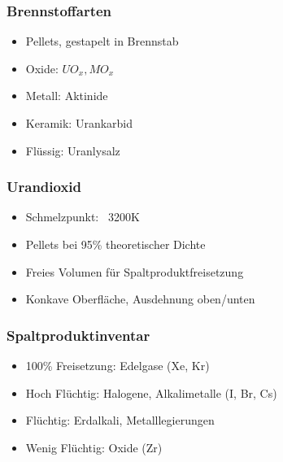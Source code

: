 \documentclass[12pt]{article}
\begin{document}
\subsubsection{Brennstoffarten}
\begin{itemize}[noitemsep]
	\item Pellets, gestapelt in Brennstab
	\item Oxide: \(UO_x, MO_x\)
	\item Metall: Aktinide
	\item Keramik: Urankarbid
	\item Flüssig: Uranlysalz
\end{itemize}

\subsubsection{Urandioxid}
\begin{itemize}[noitemsep]
	\item Schmelzpunkt: ~3200K
	\item Pellets bei 95\% theoretischer Dichte
	\item Freies Volumen für Spaltproduktfreisetzung
	\item Konkave Oberfläche, Ausdehnung oben/unten
\end{itemize}

\subsubsection{Spaltproduktinventar}
\begin{itemize}[noitemsep]
	\item 100\% Freisetzung: Edelgase (Xe, Kr)
	\item Hoch Flüchtig: Halogene, Alkalimetalle (I, Br, Cs)
	\item Flüchtig: Erdalkali, Metalllegierungen
	\item Wenig Flüchtig: Oxide (Zr)
\end{itemize}
\end{document}
